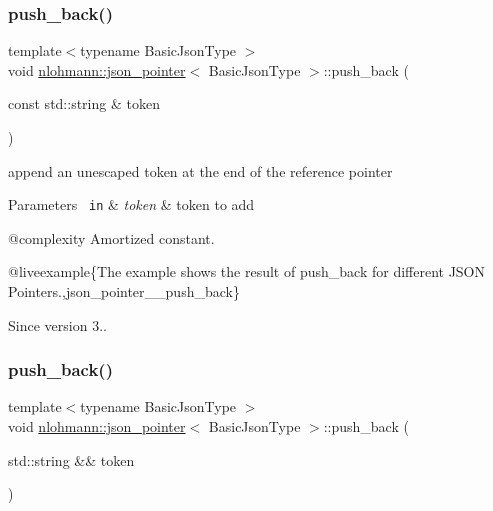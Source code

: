 \subsubsection{\texorpdfstring{push\_back()}{push\_back()}\hspace{0.1cm}{\footnotesize\ttfamily [1/2]}}
{\footnotesize\ttfamily template$<$typename Basic\+Json\+Type $>$ \\
void \mbox{\hyperlink{classnlohmann_1_1json__pointer}{nlohmann\+::json\+\_\+pointer}}$<$ Basic\+Json\+Type $>$\+::push\+\_\+back (\begin{DoxyParamCaption}\item[{const std\+::string \&}]{token }\end{DoxyParamCaption})\hspace{0.3cm}{\ttfamily [inline]}}



append an unescaped token at the end of the reference pointer 


\begin{DoxyParams}[1]{Parameters}
\mbox{\texttt{ in}}  & {\em token} & token to add\\
\hline
\end{DoxyParams}
@complexity Amortized constant.

@liveexample\{The example shows the result of {\ttfamily push\+\_\+back} for different J\+S\+ON Pointers.,json\+\_\+pointer\+\_\+\+\_\+push\+\_\+back\}

\begin{DoxySince}{Since}
version 3.. 
\end{DoxySince}
\mbox{\label{classnlohmann_1_1json__pointer_ac228b13596d3c34185da9fe61b570194}} 
\subsubsection{\texorpdfstring{push\_back()}{push\_back()}\hspace{0.1cm}{\footnotesize\ttfamily [2/2]}}
{\footnotesize\ttfamily template$<$typename Basic\+Json\+Type $>$ \\
void \mbox{\hyperlink{classnlohmann_1_1json__pointer}{nlohmann\+::json\+\_\+pointer}}$<$ Basic\+Json\+Type $>$\+::push\+\_\+back (\begin{DoxyParamCaption}\item[{std\+::string \&\&}]{token }\end{DoxyParamCaption})\hspace{0.3cm}{\ttfamily [inline]}}



